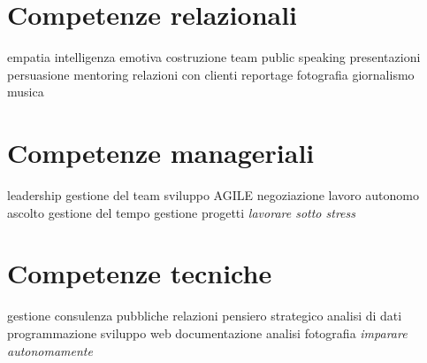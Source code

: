 \documentclass[]{friggeri-cv}
\begin{document}
\begin{aside}
\section{Competenze relazionali}
    empatia
    intelligenza emotiva
    costruzione team
    public speaking
    presentazioni
    persuasione
    mentoring
    relazioni con clienti
    reportage
    fotografia
    giornalismo
    musica
\section{Competenze manageriali}
    leadership
    gestione del team
    sviluppo AGILE
    negoziazione
    lavoro autonomo
    ascolto
    gestione del tempo
    gestione progetti
    \emph{lavorare sotto stress}
\section{Competenze tecniche}
    gestione
    consulenza
    pubbliche relazioni
    pensiero strategico
    analisi di dati
    programmazione
    sviluppo web
    documentazione
    analisi
    fotografia
    \emph{imparare autonomamente}
\end{aside}
\end{document}
